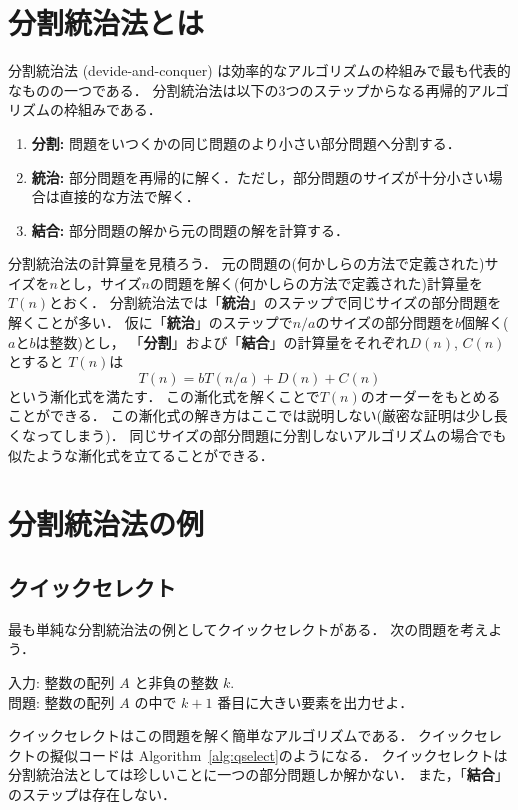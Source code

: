 \documentclass[a4paper,twoside,onecolumn,openany,article]{memoir}
\theoremstyle{remark}
\begin{document}
\section{分割統治法とは}
分割統治法 (devide-and-conquer) は効率的なアルゴリズムの枠組みで最も代表的なものの一つである．
分割統治法は以下の3つのステップからなる再帰的アルゴリズムの枠組みである．
\begin{enumerate}
\item \textbf{分割:} 問題をいつくかの同じ問題のより小さい部分問題へ分割する．
\item \textbf{統治:} 部分問題を再帰的に解く．ただし，部分問題のサイズが十分小さい場合は直接的な方法で解く．
\item \textbf{結合:} 部分問題の解から元の問題の解を計算する．
\end{enumerate}
分割統治法の計算量を見積ろう．
元の問題の(何かしらの方法で定義された)サイズを$n$とし，サイズ$n$の問題を解く(何かしらの方法で定義された)計算量を$T(n)$とおく．
分割統治法では「\textbf{統治}」のステップで同じサイズの部分問題を解くことが多い．
仮に「\textbf{統治}」のステップで$n/a$のサイズの部分問題を$b$個解く($a$と$b$は整数)とし，
「\textbf{分割}」および「\textbf{結合}」の計算量をそれぞれ$D(n)$, $C(n)$ とすると
$T(n)$は
\begin{equation*}
T(n) = bT(n/a) + D(n) + C(n)
\end{equation*}
という漸化式を満たす．
この漸化式を解くことで$T(n)$のオーダーをもとめることができる．
この漸化式の解き方はここでは説明しない(厳密な証明は少し長くなってしまう)．
同じサイズの部分問題に分割しないアルゴリズムの場合でも似たような漸化式を立てることができる．

\section{分割統治法の例}
\subsection{クイックセレクト}
最も単純な分割統治法の例としてクイックセレクトがある．
次の問題を考えよう．

\vspace{1em}
\noindent
入力: 整数の配列 $A$ と非負の整数 $k$.\\
問題: 整数の配列 $A$ の中で $k+1$ 番目に大きい要素を出力せよ．

\vspace{1em}
\noindent
クイックセレクトはこの問題を解く簡単なアルゴリズムである．
クイックセレクトの擬似コードは Algorithm~\ref{alg:qselect}のようになる．
クイックセレクトは分割統治法としては珍しいことに一つの部分問題しか解かない．
また，「\textbf{結合}」のステップは存在しない．
\end{document}
